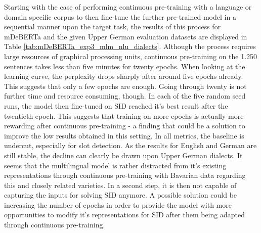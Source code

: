 \documentclass[11pt,a4paper,twoside,openright]{scrbook}
\begin{document}
Starting with the case of performing continuous pre-training with a language or domain specific corpus to then fine-tune the further pre-trained model in a sequential manner upon the target task, the results of this process for mDeBERTa and the given Upper German evaluation datasets are displayed in Table \ref{tab:mDeBERTa_exp3_mlm_nlu_dialects}. Although the process requires large resources of graphical processing units, continuous pre-training on the 1.250 sentences takes less than five minutes for twenty epochs. When looking at the learning curve, the perplexity drops sharply after around five epochs already. This suggests that only a few epochs are enough. Going through twenty is not further time and resource consuming, though. In each of the five random seed runs, the model then fine-tuned on SID reached it's best result after the twentieth epoch. This suggests that training on more epochs is actually more rewarding after continuous pre-training - a finding that could be a solution to improve the low results obtained in this setting. In all metrics, the baseline is undercut, especially for slot detection. As the results for English and German are still stable, the decline can clearly be drawn upon Upper German dialects. It seems that the multilingual model is rather distracted from it's existing representations through continuous pre-training with Bavarian data regarding this and closely related varieties. In a second step, it is then not capable of capturing the inputs for solving SID anymore. A possible solution could be increasing the number of epochs in order to provide the model with more opportunities to modify it's representations for SID after them being adapted through continuous pre-training. 

\begin{table}[!ht]
\caption{Results the for the basic sequential intermediate MLM\_NLU experiment with mDeBERTa according to Upper German dialects over three random seeds, Avg. = average on languages without English, German and Swiss German, Diff. = average performance difference to mDeBERTa baseline, sd = standard deviation}
\label{tab:mDeBERTa_exp3_mlm_nlu_dialects}
\end{table}
\end{document}
